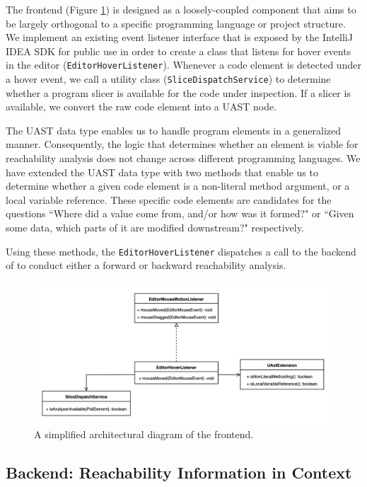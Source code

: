 The \toolname{} frontend (Figure \ref{fig:ReachHoverFrontend}) is designed as 
a loosely-coupled component that aims to be largely orthogonal to a specific 
programming language or project structure.
We implement an existing event listener interface that is exposed by the
IntelliJ IDEA \ac{SDK} for public use in order to create a class that listens
for hover events in the editor (\texttt{EditorHoverListener}).
Whenever a code element is detected under a hover event, we call a utility 
class (\texttt{SliceDispatchService}) to determine whether a program slicer
is available for the code under inspection.
If a slicer is available, we convert the raw code element into a \ac{UAST} node.

\par The \ac{UAST} data type enables us to handle program elements in a
generalized manner.
Consequently, the logic that determines whether an element is viable for
reachability analysis does not change across different programming languages.
We have extended the \ac{UAST} data type with two methods that enable us to
determine whether a given code element is a non-literal method argument, or
a local variable reference.
These specific code elements are candidates for the questions 
``Where did a value come from, and/or how was it formed?" or 
``Given some data, which parts of it are modified downstream?" respectively.

\par Using these methods, the \texttt{EditorHoverListener} dispatches a call to
the backend of \toolname{} to conduct either a forward or backward reachability
analysis.

\begin{figure}[ht]
\centering
\includegraphics[width=\textwidth]{./figs/reach-hover-frontend.png}
\caption{
  A simplified architectural diagram of the \toolname{} frontend.
}
\label{fig:ReachHoverFrontend}
\end{figure}

\subsection{Backend: Reachability Information in Context}
\label{subsec:Backend}



\endinput
